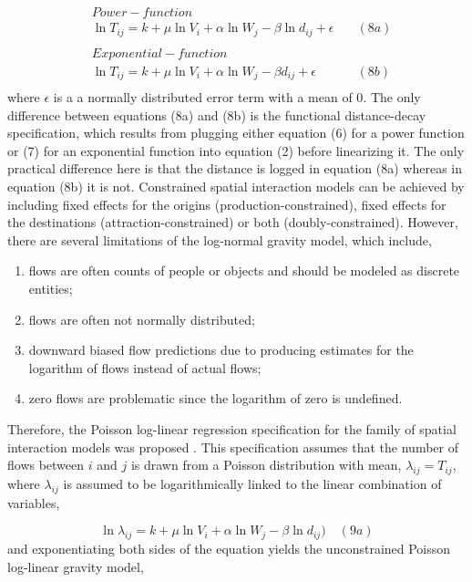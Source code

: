 \documentclass[11pt]{article}
\begin{document}
\[
\begin{align}
& Power-function \\
&\ln{T_{ij}} = k + \mu \ln{V_{i}} + \alpha \ln{W_{j}} - \beta \ln{d_{ij}} + \epsilon \quad &(8a) \\
\\
& Exponential-function \\
&\ln{T_{ij}} = k + \mu \ln{V_{i}} + \alpha \ln{W_{j}} - \beta {d_{ij}} + \epsilon \quad &(8b) \\
\end{align}
\]
%
where \(\epsilon\) is a a normally distributed error term with a mean of
0. The only difference between equations (8a) and (8b) is the functional
distance-decay specification, which results from plugging either
equation (6) for a power function or (7) for an exponential function
into equation (2) before linearizing it. The only practical difference
here is that the distance is logged in equation (8a) whereas in equation
(8b) it is not. Constrained spatial interaction models can be achieved
by including fixed effects for the origins (production-constrained),
fixed effects for the destinations (attraction-constrained) or both
(doubly-constrained). However, there are several limitations of the
log-normal gravity model, which include,

\begin{enumerate}
\def\labelenumi{\arabic{enumi}.}
\itemsep1pt\parskip0pt
\item
  flows are often counts of people or objects and should be modeled as
  discrete entities;
\item
  flows are often not normally distributed;
\item
  downward biased flow predictions due to producing estimates for the
  logarithm of flows instead of actual flows;
\item
  zero flows are problematic since the logarithm of zero is undefined.
\end{enumerate}

Therefore,  the Poisson log-linear
regression specification for the family of spatial interaction models was proposed \citetext{\citealp{flowerdew_method_1982}; \citealp{flowerdew_fitting_1988}}.
This specification assumes that the number of flows between \(i\) and
\(j\) is drawn from a Poisson distribution with mean,
\(\lambda_{ij} = T_{ij}\), where \(\lambda_{ij}\) is assumed to be
logarithmically linked to the linear combination of variables,

\[\ln{\lambda_{ij}} = k + \mu \ln V_{i} + \alpha \ln W_{j} - \beta \ln d_{ij}) \quad (9a)\]
%
and exponentiating both sides of the equation yields the unconstrained
Poisson log-linear gravity model,
\end{document}
